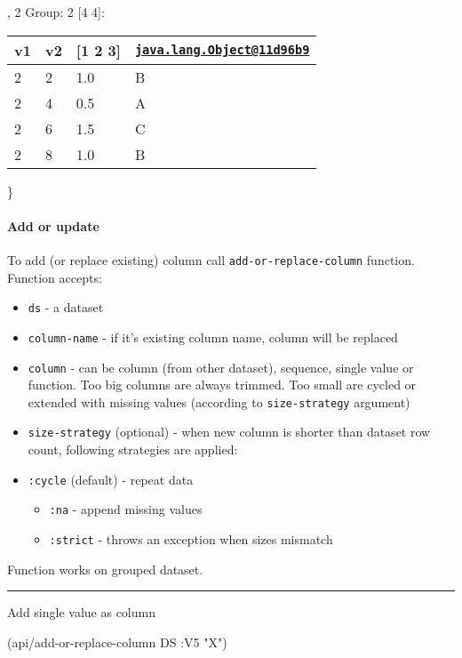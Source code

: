 \documentclass[]{article}
\newenvironment{Shaded}{\begin{snugshade}}{\end{snugshade}}
\newcommand{\AttributeTok}[1]{\textcolor[rgb]{0.77,0.63,0.00}{#1}}
\newcommand{\NormalTok}[1]{#1}
\newcommand{\StringTok}[1]{\textcolor[rgb]{0.31,0.60,0.02}{#1}}
\providecommand{\tightlist}{%
  \setlength{\itemsep}{0pt}\setlength{\parskip}{0pt}}
\let\oldparagraph\paragraph
\renewcommand{\paragraph}[1]{\oldparagraph{#1}\mbox{}}
\begin{document}
, 2 Group: 2 {[}4 4{]}:

\begin{longtable}[]{@{}llll@{}}
\toprule
v1 & v2 & {[}1 2 3{]} &
\href{mailto:java.lang.Object@11d96b9}{\nolinkurl{java.lang.Object@11d96b9}}\tabularnewline
\midrule
\endhead
2 & 2 & 1.0 & B\tabularnewline
2 & 4 & 0.5 & A\tabularnewline
2 & 6 & 1.5 & C\tabularnewline
2 & 8 & 1.0 & B\tabularnewline
\bottomrule
\end{longtable}

\}

\hypertarget{add-or-update}{%
\paragraph{Add or update}\label{add-or-update}}

To add (or replace existing) column call \texttt{add-or-replace-column}
function. Function accepts:

\begin{itemize}
\tightlist
\item
  \texttt{ds} - a dataset
\item
  \texttt{column-name} - if it's existing column name, column will be
  replaced
\item
  \texttt{column} - can be column (from other dataset), sequence, single
  value or function. Too big columns are always trimmed. Too small are
  cycled or extended with missing values (according to
  \texttt{size-strategy} argument)
\item
  \texttt{size-strategy} (optional) - when new column is shorter than
  dataset row count, following strategies are applied:
\item
  \texttt{:cycle} (default) - repeat data

  \begin{itemize}
  \tightlist
  \item
    \texttt{:na} - append missing values
  \item
    \texttt{:strict} - throws an exception when sizes mismatch
  \end{itemize}
\end{itemize}

Function works on grouped dataset.

\begin{center}\rule{0.5\linewidth}{0.5pt}\end{center}

Add single value as column

\begin{Shaded}
\begin{Highlighting}[]
\NormalTok{(api/add-or-replace-column DS }\AttributeTok{:V5} \StringTok{"X"}\NormalTok{)}
\end{Highlighting}
\end{Shaded}
\end{document}
